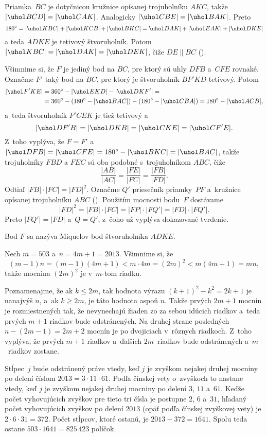 {%
Priamka~$BC$ je dotyčnicou kružnice opísanej trojuholníku $AKC$, takže $|\uhol BCD|=|\uhol CAK|$. Analogicky $|\uhol CBE|=|\uhol BAK|$.
%
Preto
$$
180^{\circ}=|\uhol KBC|+|\uhol KCB|+|\uhol BKC|=\uhol DAK|+|\uhol EAK|+|\uhol DKE|
$$
a teda $ADKE$ je tetivový štvoruholník. Potom $|\uhol KBC| = |\uhol DAK| = |\uhol DEK|$, čiže $DE\parallel BC$ (\obr).
%

Všimnime si, že $F$ je jediný bod na $BC$, pre ktorý sú uhly $DFB$ a~$CFE$ rovnaké. Označme $F'$ taký bod na $BC$, pre ktorý je štvoruholník $BF'KD$ tetivový. Potom
$$
\aligned
|\uhol F'KE|&=360^{\circ}-|\uhol EKD|-|\uhol DKF'|=\\
&=360^{\circ}-(180^{\circ}-|\uhol BAC|)-(180^{\circ}-|\uhol CBA|)=180^{\circ}-|\uhol ACB|,
\endaligned
$$
a~teda štvoruholník $F'CEK$ je tiež tetivový a
$$
|\uhol DF'B| = |\uhol DKB| = |\uhol CKE| = |\uhol CF'E|.
$$
%
Z~toho vyplýva, že $F = F'$ a $|\uhol DFB| = |\uhol CFE|=180^{\circ}-|\uhol BKC| = |\uhol BAC|$, takže trojuholníky $FBD$ a $FEC$ sú oba podobné s~trojuholníkom $ABC$, čiže
$$
\frac{|AB|}{|AC|}=\frac{|FE|}{|FC|}=\frac{|FB|}{|FD|}.
$$
Odtiaľ $|FB|\cdot|FC|=|FD|^2$. Označme $Q'$ priesečník priamky~$PF$ a~kružnice opísanej trojuholníku $ABC$ (\obr). Použitím mocnosti bodu~$F$ dostávame
$$
|FD|^2=|FB|\cdot|FC|=|FP|\cdot|FQ'|=|FD|\cdot|FQ'|.
$$
Preto $|FQ'|=|FD|$ a~$Q=Q'$, z~čoho už vyplýva dokazované tvrdenie.



\poznamka
Bod $F$ sa nazýva Miquelov bod štvoruholníka $ADKE$.
}

{%
Nech $m = 503$ a~$n = 4m + 1 = 2013$. Všimnime si, že
$$
(m-1)n = (m-1)(4m + 1) < m \cdot 4m = (2m)^2 < m(4m + 1) = mn,
$$
takže mocnina $(2m)^2$ je v~$m$-tom riadku.

Poznamenajme, že ak $k\le 2m$, tak hodnota výrazu $(k + 1)^2-k^2 = 2k + 1$ je nanajvýš $n$, a~ak $k \ge 2m$, je táto hodnota aspoň $n$.
Takže prvých $2m+1$ mocnín je rozmiestnených tak, že nevynechajú žiaden zo za sebou idúcich riadkov a~teda prvých $m + 1$ riadkov bude odstránených. Na druhej strane posledných $n-(2m-1) = 2m + 2$ mocnín je po dvojiciach v~rôznych riadkoch. Z~toho vyplýva, že prvých $m + 1$ riadkov a~ďalších $2m$~riadkov bude odstránených a~$m$~riadkov zostane.

Stĺpec~$j$ bude odstránený práve vtedy, keď $j$ je zvyškom nejakej druhej mocniny po delení číslom $2013 = 3 \cdot 11 \cdot 61$. Podľa čínskej vety o~zvyškoch to nastane vtedy, keď $j$ je zvyškom nejakej druhej mocniny po delení $3$, $11$ a~$61$. Keďže počet vyhovujúcich zvyškov pre tieto tri čísla je postupne $2$, $6$ a~$31$, hľadaný počet vyhovujúcich zvyškov po delení $2013$ (opäť podľa čínskej zvyškovej vety) je $2\cdot 6\cdot 31 = 372$. Počet stĺpcov, ktoré ostanú, je $2013-372 = 1641$. Spolu teda ostane $503 \cdot 1641 = 825\,423$ políčok.
}

